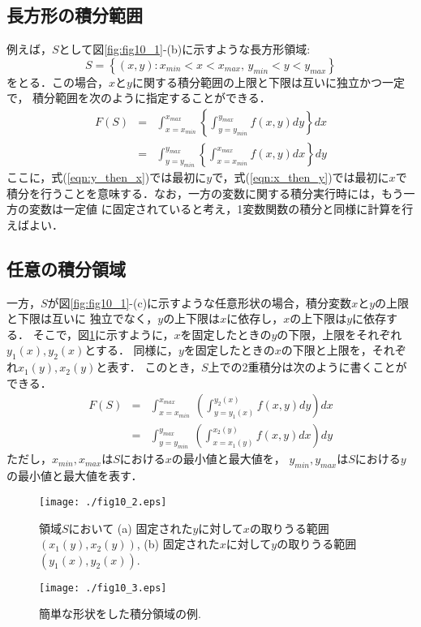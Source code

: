 ﻿\documentclass[10pt,a4j]{jbook}
\begin{document}
\subsection{長方形の積分範囲}
例えば，$S$として図\ref{fig:fig10_1}-(b)に示すような長方形領域:
\begin{equation}
	S=\left\{(x,y):x_{min}<x<x_{max}, \, y_{min}<y<y_{max} \right\}
	\label{eqn:Sa}
\end{equation}
をとる．この場合，$x$と$y$に関する積分範囲の上限と下限は互いに独立かつ一定で，
積分範囲を次のように指定することができる．
\begin{eqnarray}
	F(S)
	&=&
	\int_{x=x_{min}}^{x_{max}}\left\{\int_{y=y_{min}}^{y_{max}} f(x,y)dy\right\} dx
	\label{eqn:y_then_x}
	\\
	&=&
	\int_{y=y_{min}}^{y_{max}}\left\{\int_{x=x_{min}}^{x_{max}} f(x,y)dx\right\} dy
	\label{eqn:x_then_y}
\end{eqnarray}
ここに，式(\ref{eqn:y_then_x})では最初に$y$で，式(\ref{eqn:x_then_y})では最初に$x$で
積分を行うことを意味する．なお，一方の変数に関する積分実行時には，もう一方の変数は一定値
に固定されていると考え，1変数関数の積分と同様に計算を行えばよい．
\subsection{任意の積分領域}
一方，$S$が図\ref{fig:fig10_1}-(c)に示すような任意形状の場合，積分変数$x$と$y$の上限と下限は互いに
独立でなく，$y$の上下限は$x$に依存し，$x$の上下限は$y$に依存する．
そこで，図\ref{fig:fig10_2}に示すように，$x$を固定したときの$y$の下限，上限をそれぞれ$y_1(x),y_2(x)$とする．
同様に，$y$を固定したときの$x$の下限と上限を，それぞれ$x_1(y),x_2(y)$と表す．
このとき，$S$上での2重積分は次のように書くことができる．
\begin{eqnarray}
	F(S) &=& 
	\int_{x=x_{min}}^{x_{max}}\ \left( \int_{y=y_1(x)}^{y_2(x)}f(x,y)dy\right) dx
	\label{eqn:iint_xy}
	\\
	&=& 
	\int_{y=y_{min}}^{y_{max}}\ \left( \int_{x=x_1(y)}^{x_2(y)}f(x,y)dx\right) dy
	\label{eqn:iint_yx}
\end{eqnarray}
ただし，$x_{min},x_{max}$は$S$における$x$の最小値と最大値を，
$y_{min},y_{max}$は$S$における$y$の最小値と最大値を表す．
\begin{figure}[h]
	\begin{center}
	\texttt{[image: ./fig10\_2.eps]} 
	\end{center}
	\caption{
		領域$S$において
		(a) 固定された$y$に対して$x$の取りうる範囲$\left(x_1(y),x_2(y)\right)$, 
		(b) 固定された$x$に対して$y$の取りうる範囲$\left(y_1(x),y_2(x)\right)$. 
	} 
	\label{fig:fig10_2}
\end{figure}
\begin{figure}[h]
	\begin{center}
	\texttt{[image: ./fig10\_3.eps]} 
	\end{center}
	\caption{
		簡単な形状をした積分領域の例. 
	} 
	\label{fig:fig10_3}
\end{figure}
\end{document}
